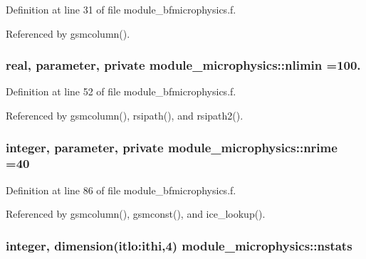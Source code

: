 Definition at line 31 of file module\+\_\+bfmicrophysics.\+f.



Referenced by gsmcolumn().

\subsubsection[{\texorpdfstring{nlimin}{nlimin}}]{\setlength{\rightskip}{0pt plus 5cm}real, parameter, private module\+\_\+microphysics\+::nlimin =100.\hspace{0.3cm}{\ttfamily [private]}}\hypertarget{namespacemodule__microphysics_a9a5f8e03c03725a03b9fc923d095e31a}{}\label{namespacemodule__microphysics_a9a5f8e03c03725a03b9fc923d095e31a}


Definition at line 52 of file module\+\_\+bfmicrophysics.\+f.



Referenced by gsmcolumn(), rsipath(), and rsipath2().

\subsubsection[{\texorpdfstring{nrime}{nrime}}]{\setlength{\rightskip}{0pt plus 5cm}integer, parameter, private module\+\_\+microphysics\+::nrime =40\hspace{0.3cm}{\ttfamily [private]}}\hypertarget{namespacemodule__microphysics_aaea427462ab04c90a0e8188c08e102c2}{}\label{namespacemodule__microphysics_aaea427462ab04c90a0e8188c08e102c2}


Definition at line 86 of file module\+\_\+bfmicrophysics.\+f.



Referenced by gsmcolumn(), gsmconst(), and ice\+\_\+lookup().

\subsubsection[{\texorpdfstring{nstats}{nstats}}]{\setlength{\rightskip}{0pt plus 5cm}integer, dimension(itlo\+:ithi,4) module\+\_\+microphysics\+::nstats}\hypertarget{namespacemodule__microphysics_a8893b7e5e0d04741a7e155c999480f92}{}\label{namespacemodule__microphysics_a8893b7e5e0d04741a7e155c999480f92}


